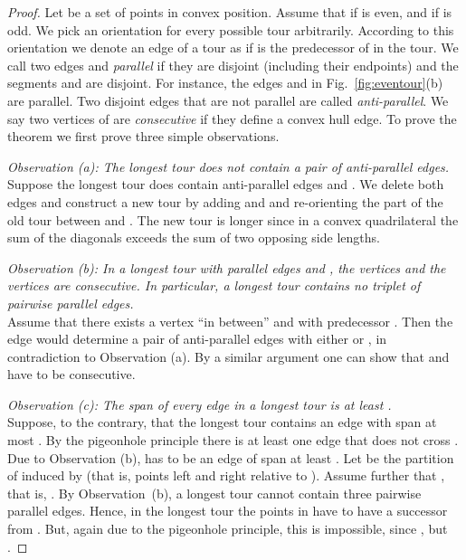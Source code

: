 \documentclass[11pt]{article}
\begin{document}
\begin{proof}
Let  be a set of  points in convex position. Assume that 
if  is even, and  if  is odd.
We pick an orientation for every possible tour arbitrarily.
 According to this orientation we denote an edge  of a tour as
  if  is the
predecessor of  in the tour. We call two edges  and  \emph{parallel} if they are disjoint (including their endpoints)
and the segments  and  are disjoint. 
For instance, the edges  and  in
Fig.~\ref{fig:eventour}(b) are parallel. Two disjoint edges that are not
parallel are called \emph{anti-parallel}.
We say two vertices of  are \emph{consecutive} if they define a convex hull edge.
To prove the theorem we first prove three simple observations.

\medskip\noindent
{\it Observation (a): The longest tour does not contain
a pair of anti-parallel edges.}\\ 
Suppose the longest tour does contain anti-parallel edges  and
. We delete both edges and construct a new tour by adding
 and  and re-orienting the part of the old tour
between  and . The new tour is longer since in a convex
quadrilateral the sum of the diagonals exceeds the sum of two opposing
side lengths. 

\medskip\noindent
{\it Observation (b): In a longest tour with parallel edges
 and , the vertices  and the vertices  are
consecutive. In particular, a longest tour contains no triplet of
pairwise parallel edges.} \\ 
Assume that there exists a vertex  ``in between''  and 
with predecessor . Then the edge  
would determine a pair of anti-parallel edges with either 
 or , in contradiction to Observation (a).
By a similar argument one can show that  and  have to be consecutive. 


\medskip\noindent
{\it Observation (c): The span of every edge in a longest
tour is at least .} \\
Suppose, to the contrary, that the longest tour contains an edge
 with span at most . By the pigeonhole principle
there is at least one edge  that does not cross .
Due to Observation (b),  has to be an edge of span at least .
Let  be the partition of  induced by 
(that is, points left and right relative to ). Assume further that
, that is, . By Observation~(b),
a longest tour cannot contain three pairwise parallel edges. Hence,
in the longest tour the points in  have to have a
successor from . But, again due to the pigeonhole principle,
this is impossible, since , but . 


\end{proof}
\end{document}
